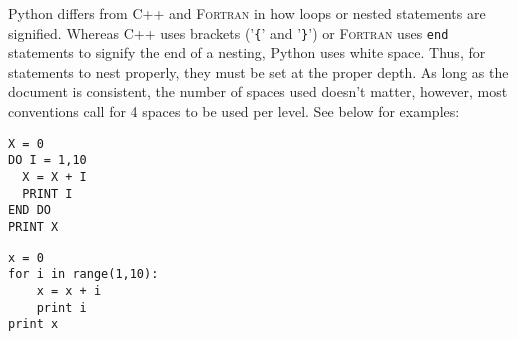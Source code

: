 \documentclass[a4paper,11pt]{report}
\begin{document}
Python differs from C++ and \textsc{Fortran} in how loops or nested statements are signified. Whereas
C++ uses brackets ('\verb|{|' and '\verb|}|') or \textsc{Fortran} uses \verb|end| statements to signify the end of a
nesting, Python uses white space. Thus, for statements to nest properly, they must be set at the 
proper depth. As long as the document is consistent, the number of spaces used doesn't matter, however,
most conventions call for 4 spaces to be used per level. See below for examples:

\begin{Verbatim}[frame=single, label=\textsc{Fortran}, baselinestretch=1, fontsize=\small]
X = 0
DO I = 1,10
  X = X + I
  PRINT I
END DO
PRINT X
\end{Verbatim}

\begin{Verbatim}[frame=single, label=Python, baselinestretch=1, fontsize=\small]
x = 0
for i in range(1,10):
    x = x + i
    print i
print x
\end{Verbatim}




\end{document}
